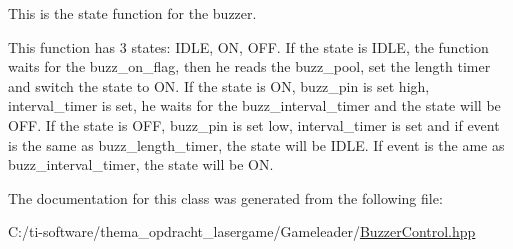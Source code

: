 This is the state function for the buzzer. 

This function has 3 states\+: I\+D\+LE, ON, O\+FF. If the state is I\+D\+LE, the function waits for the buzz\+\_\+on\+\_\+flag, then he reads the buzz\+\_\+pool, set the length timer and switch the state to ON. If the state is ON, buzz\+\_\+pin is set high, interval\+\_\+timer is set, he waits for the buzz\+\_\+interval\+\_\+timer and the state will be O\+FF. If the state is O\+FF, buzz\+\_\+pin is set low, interval\+\_\+timer is set and if event is the same as buzz\+\_\+length\+\_\+timer, the state will be I\+D\+LE. If event is the ame as buzz\+\_\+interval\+\_\+timer, the state will be ON. 

The documentation for this class was generated from the following file\+:\begin{DoxyCompactItemize}
\item 
C\+:/ti-\/software/thema\+\_\+opdracht\+\_\+lasergame/\+Gameleader/\mbox{\hyperlink{_buzzer_control_8hpp}{Buzzer\+Control.\+hpp}}\end{DoxyCompactItemize}
